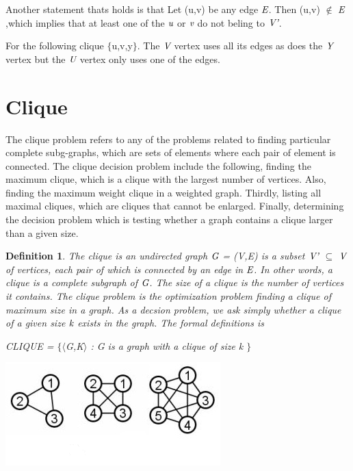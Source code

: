 \documentclass[a4paper]{report}
\newtheorem{defi}{Definition}
\begin{document}
\vspace{3mm}
Another statement thats holds is that Let (u,v) be any edge $\emph{E}$. Then (u,v) $\not\in$ $\emph{E}$,which implies that at least one of the $\emph{u}$ or $\emph{v}$ do not beling to $\emph{V'}$.

\vspace{3mm}
For the following clique $\lbrace$u,v,y$\rbrace$. The $\emph{V}$ vertex uses all its edges as does the $\emph{Y}$ vertex but the $\emph{U}$ vertex only uses one of the edges.



\section{Clique}

The clique problem refers to any of the problems related to finding particular complete subg-graphs, which are sets of elements where each pair of element is connected. The clique decision problem include the following, finding the maximum clique, which is a clique with the largest number of vertices. Also, finding the maximum weight clique in a weighted graph. Thirdly, listing all maximal cliques, which are cliques that cannot be enlarged. Finally, determining the decision problem which is testing whether a graph contains a clique larger than a given size.

\begin{defi}
The clique is an undirected graph $\emph{G}$ = (V,E) is a subset $\emph{V'}$ $\subseteq$ $\emph{V}$ of vertices, each pair of which is connected by an edge in $\emph{E}$. In other words, a clique is a complete subgraph of $\emph{G}$. The size of a clique is the number of vertices it contains. The clique problem is the optimization problem finding a clique of maximum size in a graph. As a decsion problem, we ask simply whether a clique of a given size $\emph{k}$ exists in the graph. The formal definitions is 

CLIQUE = $\lbrace$$\langle$G,K$\rangle$ : G is a graph with a clique of size k $\rbrace$
\end{defi}

\begin{center}
\includegraphics[scale=0.80]{clique.png}
\end{center}
\end{document}

